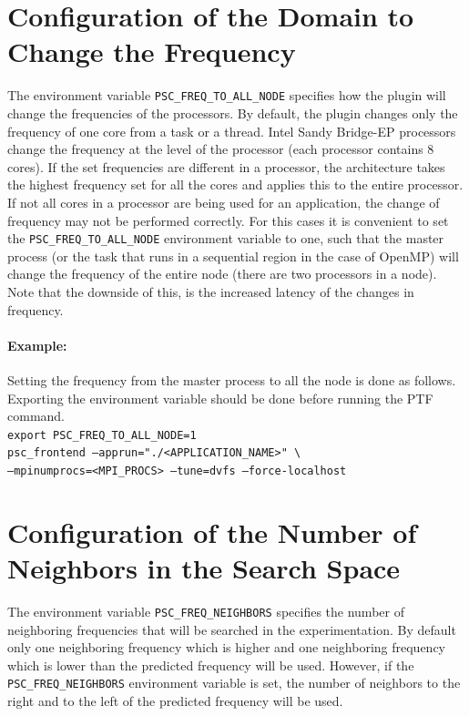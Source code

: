 \documentclass[11pt,a4paper, oneside]{book} %
\begin{document}
  \section{Configuration of the Domain to Change the Frequency }
  The environment variable \texttt{PSC\_FREQ\_TO\_ALL\_NODE} specifies how the plugin will change the frequencies of the processors. By default, the plugin changes only the frequency of one core from a task or a thread. Intel Sandy Bridge-EP processors change the frequency at the level of the processor (each processor contains 8 cores). If the set frequencies are different in a processor, the architecture takes the highest frequency set for all the cores and applies this to the entire processor. If not all cores in a processor are being used for an application, the change of frequency may not be performed correctly. For this cases it is convenient to set the \texttt{PSC\_FREQ\_TO\_ALL\_NODE} environment variable to one, such that the master process (or the task that runs in a sequential region in the case of OpenMP) will change the frequency of the entire node (there are two processors in a node). Note that the downside of this, is the increased latency of the changes in frequency.
    \paragraph{Example:} Setting the frequency from the master process to all the node is done as follows. Exporting the environment variable should be done before running the PTF command.\\
  \texttt{export PSC\_FREQ\_TO\_ALL\_NODE=1} \\
  \texttt{psc\_frontend --apprun="./<APPLICATION\_NAME>" \textbackslash \\ --mpinumprocs=<MPI\_PROCS> --tune=dvfs --force-localhost}

  \section{Configuration of the Number of Neighbors in the Search Space }
  The environment variable \texttt{PSC\_FREQ\_NEIGHBORS} specifies the number of neighboring frequencies that will be searched in the experimentation.
  By default only one neighboring frequency which is higher and one neighboring frequency which is lower than the predicted frequency will be used.
  However, if the \texttt{PSC\_FREQ\_NEIGHBORS} environment variable is set, the number of neighbors to the right and to the left of the predicted frequency will be used.
\end{document}
